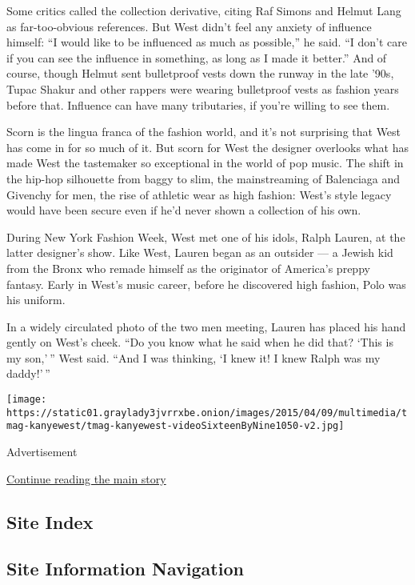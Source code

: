 Some critics called the collection derivative, citing Raf Simons and
Helmut Lang as far-too-obvious references. But West didn't feel any
anxiety of influence himself: ``I would like to be influenced as much as
possible,'' he said. ``I don't care if you can see the influence in
something, as long as I made it better.'' And of course, though Helmut
sent bulletproof vests down the runway in the late '90s, Tupac Shakur
and other rappers were wearing bulletproof vests as fashion years before
that. Influence can have many tributaries, if you're willing to see
them.

Scorn is the lingua franca of the fashion world, and it's not surprising
that West has come in for so much of it. But scorn for West the designer
overlooks what has made West the tastemaker so exceptional in the world
of pop music. The shift in the hip-hop silhouette from baggy to slim,
the mainstreaming of Balenciaga and Givenchy for men, the rise of
athletic wear as high fashion: West's style legacy would have been
secure even if he'd never shown a collection of his own.

During New York Fashion Week, West met one of his idols, Ralph Lauren,
at the latter designer's show. Like West, Lauren began as an outsider
--- a Jewish kid from the Bronx who remade himself as the originator of
America's preppy fantasy. Early in West's music career, before he
discovered high fashion, Polo was his uniform.

In a widely circulated photo of the two men meeting, Lauren has placed
his hand gently on West's cheek. ``Do you know what he said when he did
that? `This is my son,' '' West said. ``And I was thinking, `I knew it!
I knew Ralph was my daddy!' ''

\texttt{[image: https://static01.graylady3jvrrxbe.onion/images/2015/04/09/multimedia/tmag-kanyewest/tmag-kanyewest-videoSixteenByNine1050-v2.jpg]}

Advertisement

\protect\hyperlink{after-bottom}{Continue reading the main story}

\hypertarget{site-index}{%
\subsection{Site Index}\label{site-index}}

\hypertarget{site-information-navigation}{%
\subsection{Site Information
Navigation}\label{site-information-navigation}}

